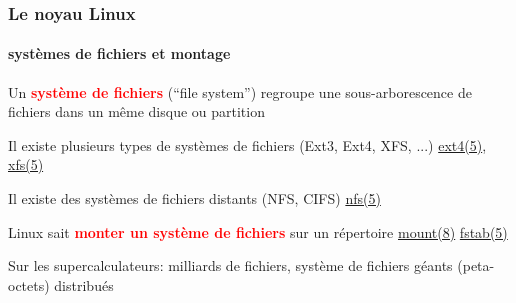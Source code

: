 \documentclass[xcolor=svgnames,final,smaller,a4]{beamer}
\begin{document}
\begin{frame}
  \frametitle{Le noyau Linux}
  \framesubtitle{systèmes de fichiers et montage} 

Un  \textbf{\textcolor{red}{système de fichiers}} (``file system'') regroupe une sous-arborescence de fichiers dans un même disque ou partition

\vspace{0.5cm}

Il existe plusieurs types de systèmes de fichiers (Ext3, Ext4, XFS, ...)
  \href{https://man7.org/linux/man-pages/man5/ext4.5.html}{ext4(5)},
  \href{https://man7.org/linux/man-pages/man5/xfs.5.html}{xfs(5)}

\vspace{0.5cm}

Il existe des systèmes de fichiers distants (NFS, CIFS)
  \href{https://man7.org/linux/man-pages/man5/nfs.5.html}{nfs(5)}

\vspace{0.5cm}

Linux sait \textbf{\textcolor{red}{monter un système de fichiers}} sur un répertoire 
\href{https://man7.org/linux/man-pages/man8/mount.8.html}{mount(8)}
  \href{https://man7.org/linux/man-pages/man5/fstab.5.html}{fstab(5)}

\vspace{0.5cm}

Sur les supercalculateurs: milliards de fichiers, système de fichiers géants (peta-octets) distribués

\end{frame}
\end{document}
